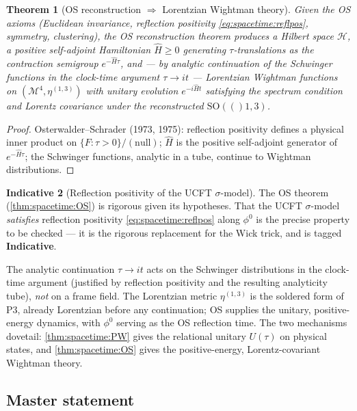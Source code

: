 \documentclass[11pt]{article}
\theoremstyle{plain}
\newtheorem{theorem}{Theorem}[section]
\theoremstyle{definition}
\newtheorem{indicative}[theorem]{Indicative}
\theoremstyle{remark}
\newcommand{\SO}[1]{\mathrm{SO}(#1)}
\begin{document}
\begin{theorem}[OS reconstruction $\Rightarrow$ Lorentzian Wightman theory]
\label{thm:spacetime:OS}
Given the OS axioms (Euclidean invariance, reflection positivity
\eqref{eq:spacetime:reflpos}, symmetry, clustering), the OS reconstruction theorem
produces a Hilbert space $\mathcal H$, a positive self-adjoint Hamiltonian
$\widehat H\ge0$ generating $\tau$-translations as the contraction semigroup
$e^{-\widehat H\tau}$, and --- by analytic continuation of the Schwinger functions in
the clock-time argument $\tau\to it$ --- Lorentzian Wightman functions on
$(\mathcal M^4,\eta^{(1,3)})$ with unitary evolution $e^{-i\widehat H t}$ satisfying the
spectrum condition and Lorentz covariance under the reconstructed $\SO(1,3)$.
\end{theorem}
\begin{proof}
Osterwalder--Schrader (1973, 1975): reflection positivity defines a physical inner
product on $\{F:\tau>0\}/(\text{null})$; $\widehat H$ is the positive self-adjoint
generator of $e^{-\widehat H\tau}$; the Schwinger functions, analytic in a tube,
continue to Wightman distributions.
\end{proof}

\begin{indicative}[Reflection positivity of the UCFT $\sigma$-model]
\label{ind:spacetime:reflpos}
The OS theorem (\autoref{thm:spacetime:OS}) is rigorous given its hypotheses. That the
UCFT $\sigma$-model \emph{satisfies} reflection positivity \eqref{eq:spacetime:reflpos}
along $\phi^0$ is the precise property to be checked --- it is the rigorous
replacement for the Wick trick, and is tagged \textbf{Indicative}.
\end{indicative}

The analytic continuation $\tau\to it$ acts on the Schwinger distributions in the
clock-time argument (justified by reflection positivity and the resulting analyticity
tube), \emph{not} on a frame field. The Lorentzian metric $\eta^{(1,3)}$ is the
soldered form of P3, already Lorentzian before any continuation; OS supplies the
unitary, positive-energy dynamics, with $\phi^0$ serving as the OS reflection time. The
two mechanisms dovetail: \autoref{thm:spacetime:PW} gives the relational unitary
$U(\tau)$ on physical states, and \autoref{thm:spacetime:OS} gives the positive-energy,
Lorentz-covariant Wightman theory.

\subsection{Master statement}
\label{sec:spacetime:master}
\end{document}
